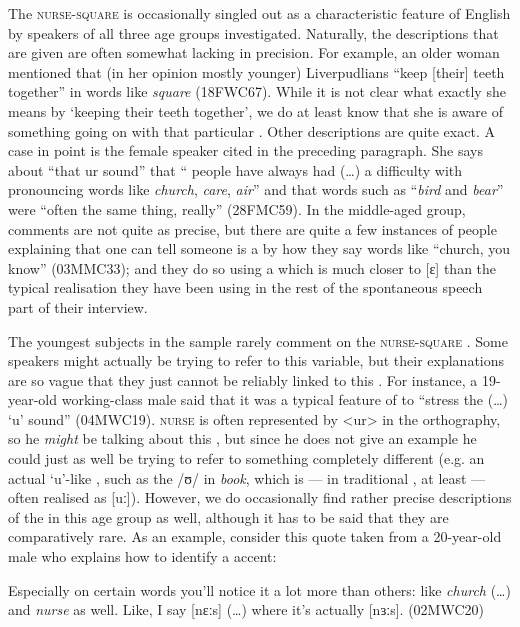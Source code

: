 The \textsc{nurse}-\textsc{square}  is occasionally singled out as a characteristic feature of  English by speakers of all three age groups investigated.
Naturally, the descriptions that are given are often somewhat lacking in precision.
For example, an older woman mentioned that (in her opinion mostly younger) Liverpudlians ``keep [their] teeth together'' in words like \emph{square} (18FWC67).
While it is not clear what exactly she means by `keeping their teeth together', we do at least know that she is aware of something going on with that particular .
Other descriptions are quite exact.
A case in point is the female speaker cited in the preceding paragraph.
She says about ``that ur sound'' that  `` people have always had (\ldots) a difficulty with pronouncing words like \emph{church}, \emph{care}, \emph{air}'' and that words such as ``\emph{bird} and \emph{bear}'' were ``often the same thing, really'' (28FMC59).
In the middle-aged group, comments are not quite as precise, but there are quite a few instances of people explaining that one can tell someone is a  by how they say words like ``church, you know'' (03MMC33); and they do so using a  which is much closer to [ɛ] than the typical realisation they have been using in the rest of the spontaneous speech part of their interview.

The youngest subjects in the sample rarely comment on the \textsc{nurse}-\textsc{square} .
Some speakers might actually be trying to refer to this variable, but their explanations are so vague that they just cannot be reliably linked to this .
For instance, a 19-year-old working-class male said that it was a typical feature of  to ``stress the (\ldots) `u' sound'' (04MWC19).
\textsc{nurse} is often represented by <ur> in the orthography, so he \emph{might} be talking about this , but since he does not give an example he could just as well be trying to refer to something completely different (e.g. an actual `u'-like , such as the /ʊ/ in \emph{book}, which is --- in traditional , at least --- often realised as [uː]).
However, we do occasionally find rather precise descriptions of the  in this age group as well, although it has to be said that they are comparatively rare.
As an example, consider this quote taken from a 20-year-old male who explains how to identify a  accent:
\begin{example}
	Especially on certain words you'll notice it a lot more than others: like \emph{church} (\ldots) and \emph{nurse} as well.
	Like, I say [nɛːs] (\ldots) where it's actually [nɜːs]. (02MWC20)
\end{example}


